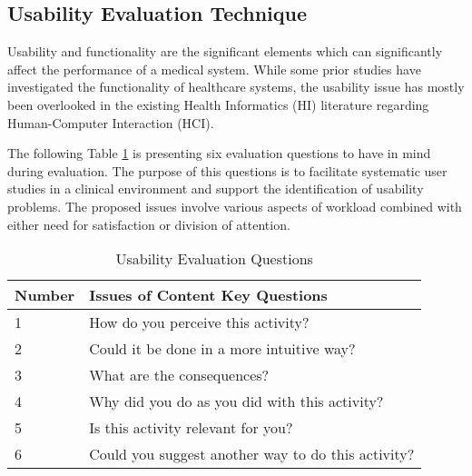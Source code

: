 \hfill

\clearpage


\subsection{Usability Evaluation Technique}

Usability and functionality are the significant elements which can significantly affect the performance of a medical system. While some prior studies \cite{Calisto:2017:TTM:3132272.3134111} have investigated the functionality of healthcare systems, the usability issue has mostly been overlooked in the existing Health Informatics (HI) literature regarding Human-Computer Interaction (HCI).

The following Table \ref{table:usability_evaluation_questions} is presenting six evaluation questions to have in mind during evaluation. The purpose of this questions is to facilitate systematic user studies in a clinical environment and support the identification of usability problems. The proposed issues involve various aspects of workload combined with either need for satisfaction or division of attention.

\begin{table}[h]
\centering
\begin{tabular}{l|l}
Number & Issues of Content Key Questions                    \\ \hline
1      & How do you perceive this activity?                 \\
2      & Could it be done in a more intuitive way?          \\
3      & What are the consequences?                         \\
4      & Why did you do as you did with this activity?      \\
5      & Is this activity relevant for you?                 \\
6      & Could you suggest another way to do this activity?
\end{tabular}
\caption{Usability Evaluation Questions}
\label{table:usability_evaluation_questions}
\end{table}


